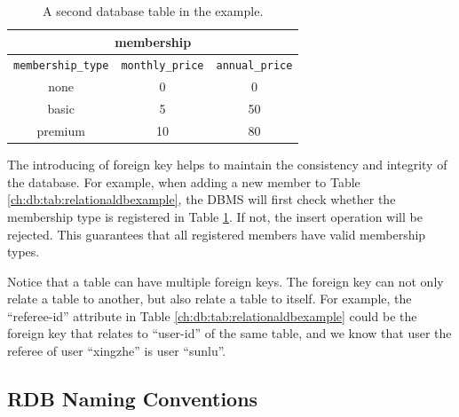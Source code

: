 \begin{table}
	\centering \caption{A second database table in the example.} \label{ch:db:tab:relationaldbexampleanother}
	\begin{tabular}{|c|c|c|}
		\hline
        \multicolumn{3}{|c|}{membership} \\ \hline
		\verb|membership_type| & \verb|monthly_price| & \verb|annual_price| \\ \hline
        none & 0 & 0 \\ \hline
        basic & 5 & 50 \\ \hline
        premium & 10 & 80 \\ \hline
	\end{tabular}
\end{table}

The introducing of foreign key helps to maintain the consistency and integrity of the database. For example, when adding a new member to Table \ref{ch:db:tab:relationaldbexample}, the DBMS will first check whether the membership type is registered in Table \ref{ch:db:tab:relationaldbexampleanother}. If not, the insert operation will be rejected. This guarantees that all registered members have valid membership types.

Notice that a table can have multiple foreign keys. The foreign key can not only relate a table to another, but also relate a table to itself. For example, the ``referee-id'' attribute in Table \ref{ch:db:tab:relationaldbexample} could be the foreign key that relates to ``user-id'' of the same table, and we know that user the referee of user ``xingzhe'' is user ``sunlu''.

\subsection{RDB Naming Conventions}

